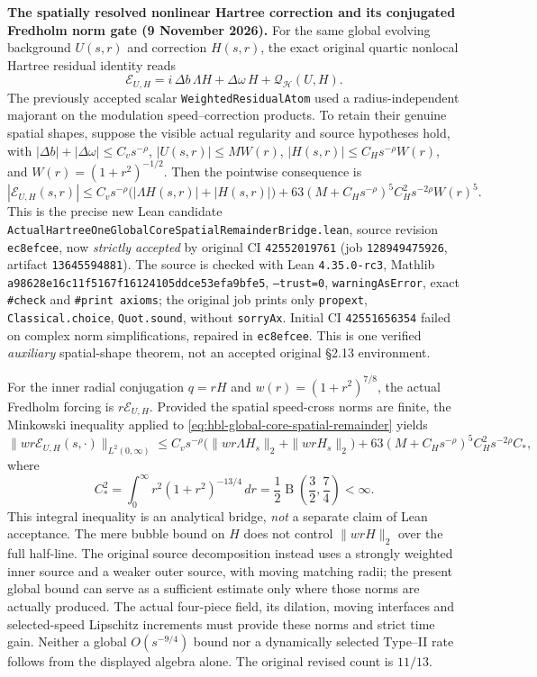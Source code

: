 \documentclass[11pt]{amsart}
\newcommand{\HH}{\mathcal H}
\begin{document}
\medskip
\noindent\textbf{The spatially resolved nonlinear Hartree correction and its
conjugated Fredholm norm gate (9 November 2026).}
For the same global evolving background $U(s,r)$ and correction $H(s,r)$,
the exact original quartic nonlocal Hartree residual identity reads
\[
 \mathcal E_{U,H}
 =i\,\Delta b\,\Lambda H+\Delta\omega\,H+\mathcal Q_{\HH}(U,H).
\]
The previously accepted scalar \texttt{WeightedResidualAtom} used a
radius-independent majorant on the modulation speed--correction products.
To retain their genuine spatial shapes, suppose the visible actual
regularity and source hypotheses hold, with
$|\Delta b|+|\Delta\omega|\le C_v s^{-\rho}$,
$|U(s,r)|\le M W(r)$, $|H(s,r)|\le C_Hs^{-\rho}W(r)$,
and $W(r)=(1+r^2)^{-1/2}$. Then the pointwise consequence is
\begin{equation}
 |\mathcal E_{U,H}(s,r)|
 \le C_v s^{-\rho}\bigl(|\Lambda H(s,r)|+|H(s,r)|\bigr)
 +63(M+C_Hs^{-\rho})^5C_H^2s^{-2\rho}W(r)^5 .
 \label{eq:hbl-global-core-spatial-remainder}
\end{equation}
This is the precise new Lean candidate
\texttt{ActualHartreeOneGlobalCoreSpatialRemainderBridge.lean},
source revision \texttt{ec8efcee}, now \emph{strictly accepted}
by original CI \texttt{42552019761} (job \texttt{128949475926},
artifact \texttt{13645594881}).  The source is checked with
Lean \texttt{4.35.0-rc3}, Mathlib
\texttt{a98628e16c11f5167f16124105ddce53efa9bfe5},
\texttt{--trust=0}, \texttt{warningAsError}, exact
\texttt{\#check} and \texttt{\#print axioms}; the original job prints
only \texttt{propext}, \texttt{Classical.choice},
\texttt{Quot.sound}, without \texttt{sorryAx}. Initial CI
\texttt{42551656354} failed on complex norm simplifications,
repaired in \texttt{ec8efcee}. This is one verified
\emph{auxiliary} spatial-shape theorem, not an accepted
original \S2.13 environment.

For the inner radial conjugation $q=rH$ and
$w(r)=(1+r^2)^{7/8}$, the actual Fredholm forcing is
$r\mathcal E_{U,H}$. Provided the spatial speed-cross norms are finite,
the Minkowski inequality applied to
\eqref{eq:hbl-global-core-spatial-remainder} yields
\[
 \|wr\mathcal E_{U,H}(s,\cdot)\|_{L^2(0,\infty)}
 \le C_v s^{-\rho}
 \bigl(\|wr\Lambda H_s\|_2+\|wrH_s\|_2\bigr)
 +63(M+C_Hs^{-\rho})^5 C_H^2s^{-2\rho}C_*,
\]
where
\[
 C_*^2=\int_0^\infty r^2(1+r^2)^{-13/4}\,dr
 =\frac12\operatorname{B}\!\left(\frac32,\frac74\right)<\infty.
\]
This integral inequality is an analytical bridge, \emph{not}
a separate claim of Lean acceptance. The mere bubble bound on $H$
does not control $\|wrH\|_2$ over the full half-line.
The original source decomposition instead uses a strongly weighted
inner source and a weaker outer source, with moving matching radii;
the present global bound can serve as a sufficient estimate only where
those norms are actually produced. The actual four-piece field,
its dilation, moving interfaces and selected-speed Lipschitz increments
must provide these norms and strict time gain. Neither a global
$O(s^{-9/4})$ bound nor a dynamically selected Type--II rate follows
from the displayed algebra alone. The original revised count is
$11/13$.
\end{document}
